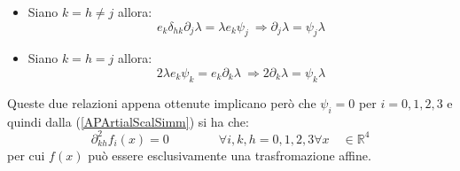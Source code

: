 \begin{itemize}
    \item Siano $k=h\neq j$ allora:
    \begin{equation*}
        e_k\delta_{hk}\partial_j\lambda=\lambda e_k\psi_j \ \Rightarrow \partial_j\lambda=\psi_j\lambda
    \end{equation*}
    \item Siano $k=h= j$ allora:
    \begin{equation*}
        2\lambda e_k\psi_k=e_k\partial_k\lambda \ \Rightarrow 2\partial_k\lambda=\psi_k\lambda
    \end{equation*}
\end{itemize}
Queste due relazioni appena ottenute implicano però che $\psi_i=0$ per $i=0,1,2,3$ e quindi dalla 
(\ref{APArtialScalSimm}) si ha che:
\begin{equation}
    \partial_{kh}^2f_i(x)=0 \qquad \qquad \forall i,k,h=0,1,2,3 \forall x \quad\in \mathbb{R}^4
\end{equation}
per cui $f(x)$ può essere esclusivamente una trasfromazione affine.